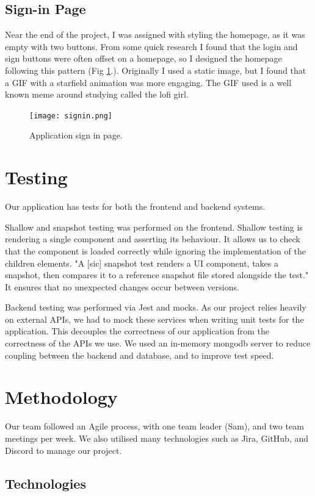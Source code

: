 \documentclass[conference]{IEEEtran}
\begin{document}
\subsection{Sign-in Page}
Near the end of the project, I was assigned with styling the homepage, as it was empty with two buttons. From some quick research I found that the login and sign buttons were often offset on a homepage, so I designed the homepage following this pattern (Fig \ref{signin}.). Originally I used a static image, but I found that a GIF with a starfield animation was more engaging. The GIF used is a well known meme around studying called the lofi girl.

\begin{figure}[htbp]
\centerline{\texttt{[image: signin.png]}}
\caption{Application sign in page.}
\label{signin}
\end{figure}

\section{Testing}
Our application has tests for both the frontend and backend systems.

Shallow and snapshot testing was performed on the frontend. Shallow testing is rendering a single component and asserting its behaviour. It allows us to check that the component is loaded correctly while ignoring the implementation of the children elements. "A [sic] snapshot test renders a UI component, takes a snapshot, then compares it to a reference snapshot file stored alongside the test.\cite{b1}" It ensures that no unexpected changes occur between versions.

Backend testing was performed via Jest and mocks. As our project relies heavily on external APIs, we had to mock these services when writing unit tests for the application. This decouples the correctness of our application from the correctness of the APIs we use. We used an in-memory mongodb server to reduce coupling between the backend and database, and to improve test speed.

\section{Methodology}
Our team followed an Agile process, with one team leader (Sam), and two team meetings per week. We also utilised many technologies such as Jira, GitHub, and Discord to manage our project.

\subsection{Technologies}
\end{document}
